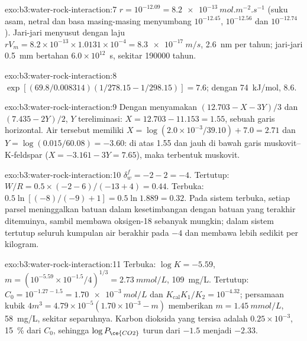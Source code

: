 \begin{solution}{exo:b3:water-rock-interaction:7}
$r = 10^{-12.09} = \qty{8.2e-13}{mol.m^{-2}.s^{-1}}$ (suku asam, netral dan
basa masing-masing menyumbang $10^{-12.45}$, $10^{-12.56}$ dan $10^{-12.74}$). Jari-jari
menyusut dengan laju $rV_m = 8.2\times10^{-13}\times1.0131\times10^{-4} =
\qty{8.3e-17}{m/s}$, \qty{2.6}{nm} per tahun; jari-jari \qty{0.5}{mm} bertahan
$6.0\times10^{12}$~s, sekitar \num{190000} tahun.
\end{solution}

\begin{solution}{exo:b3:water-rock-interaction:8}
$\exp[(69.8/0.008314)(1/278.15 - 1/298.15)] = 7.6$; dengan
\qty{74}{kJ/mol}, 8.6.
\end{solution}

\begin{solution}{exo:b3:water-rock-interaction:9}
Dengan menyamakan $(12.703 - X - 3Y)/3$ dan $(7.435 - 2Y)/2$, $Y$ tereliminasi: $X =
12.703 - 11.153 = 1.55$, sebuah garis horizontal. Air tersebut memiliki $X = \log(2.0\times
10^{-3}/39.10) + 7.0 = 2.71$ dan $Y = \log(0.015/60.08) = -3.60$: di atas 1.55
dan jauh di bawah garis muskovit--K-feldspar ($X = -3.161 - 3Y = 7.65$), maka
terbentuk muskovit.
\end{solution}

\begin{solution}{exo:b3:water-rock-interaction:10}
$\delta_w^f = -2 - 2 = -4$. Tertutup: $W/R = 0.5\times(-2 - 6)/(-13 + 4) =
0.44$. Terbuka: $0.5\ln[(-8)/(-9) + 1] = 0.5\ln1.889 = 0.32$. Pada sistem terbuka, setiap
parsel meninggalkan batuan dalam kesetimbangan dengan batuan yang terakhir ditemuinya, sambil membawa
oksigen-18 sebanyak mungkin; dalam sistem tertutup seluruh kumpulan air berakhir pada $-4$ dan
membawa lebih sedikit per kilogram.
\end{solution}

\begin{solution}{exo:b3:water-rock-interaction:11}
Terbuka: $\log K = -5.59$, $m = (10^{-5.59}\times10^{-1.5}/4)^{1/3} =
\qty{2.73}{mmol/L}$, \qty{109}{mg/L}. Tertutup: $C_0 = 10^{-1.27 - 1.5} =
\qty{1.70e-3}{mol/L}$ dan $K_{\mathrm{cal}}K_1/K_2 = 10^{-4.32}$; persamaan kubik
$4m^3 = 4.79\times10^{-5}(1.70\times10^{-3} - m)$ memberikan $m =
\qty{1.45}{mmol/L}$, \qty{58}{mg/L}, sekitar separuhnya. Karbon dioksida yang tersisa
adalah $0.25\times10^{-3}$, \qty{15}{\percent} dari $C_0$, sehingga $\log P_{\ce{CO2}}$ turun
dari $-1.5$ menjadi $-2.33$.
\end{solution}

